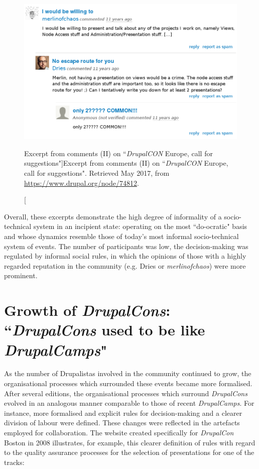 \begin{figure}[H]
  \centering
\includegraphics[width=\textwidth]{img/quotes_replacement/dcon_brussels_2016_comments02.png}
\caption[Excerpt from comments (II) on ``\textit{DrupalCON} Europe, call for suggestions"]{Excerpt from comments (II) on ``\textit{DrupalCON} Europe, call for suggestions". Retrieved  May 2017, from \url{https://www.drupal.org/node/74812}.}
\label{dcon2006_comments02}
\end{figure}

Overall, these excerpts demonstrate the high degree of informality of a socio-technical system in an incipient state: operating on the most ``do-ocratic" basis and whose dynamics resemble those of today's most informal socio-technical system of events. The number of participants was low, the decision-making was regulated by informal social rules, in which the opinions of those with a highly regarded reputation in the community (e.g. Dries or \textsl{merlinofchaos}) were more prominent.

\section{Growth of \textit{DrupalCons}: ``\textit{DrupalCons} used to be like \textit{DrupalCamps}"}
\label{subsec:dcons-growth}

As the number of Drupalistas involved in the community continued to grow,  the organisational processes which surrounded these events became more formalised. After several editions, the organisational processes which surround \textit{DrupalCons} evolved in an analogous manner comparable to those of recent \textit{DrupalCamps}. For instance, more formalised and explicit rules for decision-making and a clearer division of labour were defined. These changes were reflected in the artefacts employed for collaboration. The website created specifically for \textit{DrupalCon} Boston in 2008 illustrates, for example, this clearer definition of rules with regard to the quality assurance processes for the selection of presentations for one of the tracks:

